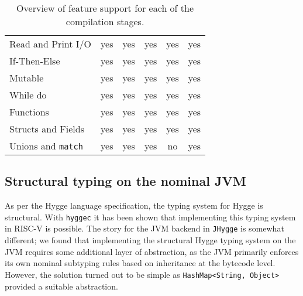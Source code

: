 \begin{table}[H]
\begin{tabular}{lccccc}
Read and Print I/O           & yes                                & yes                              & yes                                & yes                                & yes                                                              \\
If-Then-Else                 & yes                                & yes                              & yes                                & yes                                & yes                                                              \\
Mutable                      & yes                                & yes                              & yes                                & yes                                & yes                                                              \\
While do                     & yes                                & yes                              & yes                                & yes                                & yes                                                              \\
Functions                    & yes                                & yes                              & yes                                & yes                                & yes                                                              \\  
Structs and Fields & yes                                & yes                              & yes                                & yes           & yes                                         \\ 
Unions and \texttt{match}  & yes                                & yes                              & yes                                & no                                 & yes                                                             
\end{tabular}
\caption{Overview of feature support for each of the compilation stages.}
\label{table:requirements_fulfillment}
\end{table}

\subsection{Structural typing on the nominal JVM}

As per the Hygge language specification, the typing system for Hygge is structural. With \texttt{hyggec} it has been shown
that implementing this typing system in RISC-V is possible. The story for the JVM backend in \texttt{JHygge} is somewhat different;
we found that implementing the structural Hygge typing system on the JVM requires some additional layer of abstraction, as
the JVM primarily enforces its own nominal subtyping rules based on inheritance at the bytecode level.
However, the solution turned out to be simple as \texttt{HashMap<String, Object>} provided a suitable abstraction.

